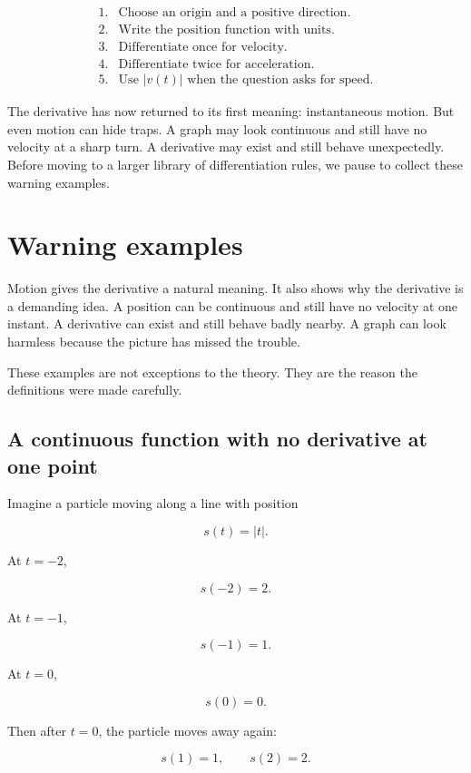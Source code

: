 \[
\begin{array}{ll}
1. & \text{Choose an origin and a positive direction.}\\
2. & \text{Write the position function with units.}\\
3. & \text{Differentiate once for velocity.}\\
4. & \text{Differentiate twice for acceleration.}\\
5. & \text{Use \(|v(t)|\) when the question asks for speed.}
\end{array}
\]

The derivative has now returned to its first meaning: instantaneous motion.  But even motion can hide traps.  A graph may look continuous and still have no velocity at a sharp turn.  A derivative may exist and still behave unexpectedly.  Before moving to a larger library of differentiation rules, we pause to collect these warning examples.
\section{Warning examples}
\label{sec:derivative-warning-examples}

Motion gives the derivative a natural meaning.  It also shows why the derivative is a demanding idea.  A position can be continuous and still have no velocity at one instant.  A derivative can exist and still behave badly nearby.  A graph can look harmless because the picture has missed the trouble.

These examples are not exceptions to the theory.  They are the reason the definitions were made carefully.

\subsection{A continuous function with no derivative at one point}
\label{subsec:continuous-no-derivative-one-point}

Imagine a particle moving along a line with position

\[
s(t)=|t|.
\]

At \(t=-2\),

\[
s(-2)=2.
\]

At \(t=-1\),

\[
s(-1)=1.
\]

At \(t=0\),

\[
s(0)=0.
\]

Then after \(t=0\), the particle moves away again:

\[
s(1)=1,
\qquad
s(2)=2.
\]

